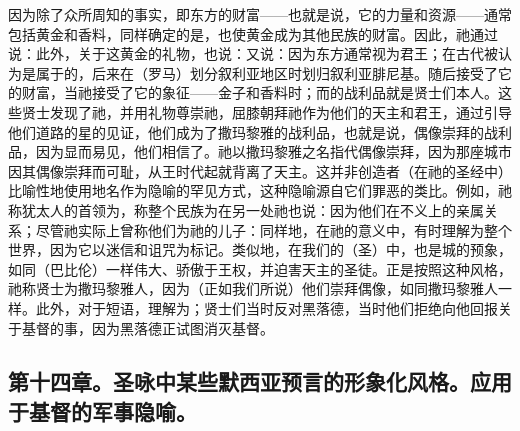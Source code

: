 因为除了众所周知的事实，即东方的财富——也就是说，它的力量和资源——通常包括黄金和香料，同样确定的是，也使黄金成为其他民族的财富。因此，祂通过说：此外，关于这黄金的礼物，也说：又说：因为东方通常视为君王；在古代被认为是属于的，后来在（罗马）划分叙利亚地区时划归叙利亚腓尼基。随后接受了它的财富，当祂接受了它的象征——金子和香料时；而的战利品就是贤士们本人。这些贤士发现了祂，并用礼物尊崇祂，屈膝朝拜祂作为他们的天主和君王，通过引导他们道路的星的见证，他们成为了撒玛黎雅的战利品，也就是说，偶像崇拜的战利品，因为显而易见，他们相信了。祂以撒玛黎雅之名指代偶像崇拜，因为那座城市因其偶像崇拜而可耻，从王时代起就背离了天主。这并非创造者（在祂的圣经中）比喻性地使用地名作为隐喻的罕见方式，这种隐喻源自它们罪恶的类比。例如，祂称犹太人的首领为，称整个民族为在另一处祂也说：因为他们在不义上的亲属关系；尽管祂实际上曾称他们为祂的儿子：同样地，在祂的意义中，有时理解为整个世界，因为它以迷信和诅咒为标记。类似地，在我们的（圣）中，也是城的预象，如同（巴比伦）一样伟大、骄傲于王权，并迫害天主的圣徒。正是按照这种风格，祂称贤士为撒玛黎雅人，因为（正如我们所说）他们崇拜偶像，如同撒玛黎雅人一样。此外，对于短语，理解为；贤士们当时反对黑落德，当时他们拒绝向他回报关于基督的事，因为黑落德正试图消灭基督。\par


\subsection{第十四章。圣咏中某些默西亚预言的形象化风格。应用于基督的军事隐喻。}

